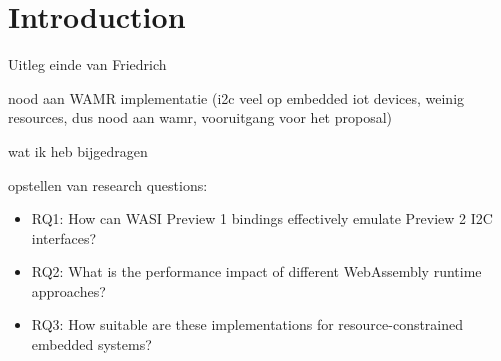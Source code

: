 \chapter{Introduction}
\label{chap:intro}

Uitleg einde van Friedrich

nood aan WAMR implementatie (i2c veel op embedded iot devices, weinig resources, dus nood aan wamr, vooruitgang voor het proposal)

wat ik heb bijgedragen

opstellen van research questions:
\begin{itemize}
    \item RQ1: How can WASI Preview 1 bindings effectively emulate Preview 2 I2C interfaces?
    \item RQ2: What is the performance impact of different WebAssembly runtime approaches?
    \item RQ3: How suitable are these implementations for resource-constrained embedded systems?
\end{itemize}